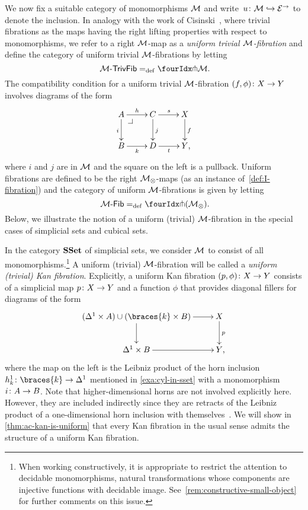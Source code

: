 \documentclass[reqno,10pt,a4paper,oneside,draft]{amsart}
\begin{document}
We now fix a suitable category of monomorphisms $\cal{M}$ and write~$u \co \cal{M} \hookrightarrow \catE^\to$ to denote the inclusion. In analogy with the work of Cisinski~\cite{cisinski-asterisque}, where trivial fibrations as the maps having the right lifting properties with respect to monomorphisms, we refer to a  right $\cal{M}$-map as a \emph{uniform trivial $\cal{M}$-fibration} and define the category of uniform trivial $\cal{M}$-fibrations  by letting
\[
  \TrivFib{\cal{M}} \defeq \liftr{\cal{M}} \rlap{.}
\]
The compatibility condition for a uniform trivial $\cal{M}$-fibration $(f, \phi) \co X \to Y$ involves diagrams of the form
\[
\xymatrix{
  A
  \ar[r]^{h}
  \ar[d]_{i}
  \pullback{dr}
&
  C \ar[d]^{j}
  \ar[r]^{s}
&
  X \ar[d]^f
\\
  B
  \ar[r]_{k}
&
  D \ar[r]_{t}
&
  Y
\rlap{,}}
\]
where $i$ and $j$ are in $\cal{M}$ and the square on the left is a pullback. Uniform fibrations are defined to be
the right $\cal{M}_\otimes$-maps (as an instance of~\cref{def:I-fibration}) and the category of uniform  $\cal{M}$-fibrations
 is given by letting
\[
  \Fib{\cal{M}} \defeq \liftr{(\cal{M}_\otimes)} \rlap{.}
\]
Below, we illustrate the notion of a uniform (trivial) $\cal{M}$-fibration in the special cases of simplicial sets and cubical sets.


\begin{example} In the category $\SSet$  of simplicial sets, we consider $\cal{M}$ to consist of all monomorphisms.\footnote{When working constructively, it is appropriate to restrict the attention to decidable  monomorphisms, \ie natural transformations whose components are injective functions with decidable image. See~\cref{rem:constructive-small-object} for further comments on this issue.} A uniform (trivial) $\cal{M}$-fibration will be called a \emph{uniform (trivial) Kan fibration}.
Explicitly, a uniform Kan fibration $(p, \phi) \co X \to Y$ consists of a simplicial map $p \co X \to Y$ and a function $\phi$ that provides diagonal fillers for diagrams of the form
\[
\xymatrix{
  (\Delta^1 \times A) \cup (\braces{k} \times B)
  \ar[r]
  \ar[d]
&
  X
  \ar[d]^{p}
\\
  \Delta^1 \times B
  \ar[r]
&
  Y
\rlap{,}}
\]
where the map on the left is the Leibniz product of the horn inclusion $h_k^1 \co \braces{k} \to \Delta^1$ mentioned in \cref{exa:cyl-in-sset} with a  monomorphism $i \co A \to B$.
Note that higher-dimensional horns are not involved explicitly here.
However, they are included indirectly since they are retracts of the Leibniz product of a one-dimensional horn inclusion with themselves~\cite[Chap.~IV, Sec.~2]{gabriel-zisman:calculus-of-fractions}.
We will show in \cref{thm:ac-kan-is-uniform} that every Kan fibration in the usual sense admits the structure of a uniform Kan fibration.
\end{example}
\end{document}
